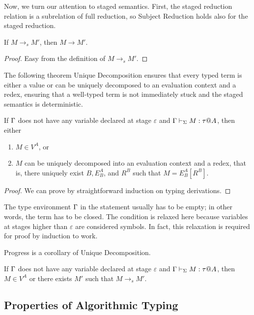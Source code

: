 Now, we turn our attention to staged semantics.  First, the staged
reduction relation is a subrelation of full reduction, so Subject
Reduction holds also for the staged reduction.

\begin{theorem}
  If $M \longrightarrow_s M'$, then $M \longrightarrow M'$.
\end{theorem}
\begin{proof}
    Easy from the definition of \( M \longrightarrow_s M' \).
\end{proof}

The following theorem Unique Decomposition ensures that every typed
term is either a value or can be uniquely decomposed to an evaluation
context and a redex, ensuring that a well-typed term is not
immediately stuck and the staged semantics is deterministic.

\begin{theorem}
  If $\Gamma$ does not have any variable declared at stage $\varepsilon$ 
  and $\Gamma \vdash_\Sigma M : \tau @ A$, then either
  \begin{enumerate}
  \item $ M \in V^A$, or
  \item $M$ can be uniquely decomposed into an evaluation context and a redex, that is, there uniquely exist $B, E^A_B$, and $R^B$ such that $M = E^A_B[R^B]$.
  \end{enumerate}
\end{theorem}

\begin{proof}
  We can prove by straightforward induction on typing derivations.
\end{proof}

The type environment $\Gamma$ in the statement usually has to be empty; in other
words, the term has to be closed. The condition is relaxed here because
variables at stages higher than \(\varepsilon\) are considered symbols. In
fact, this relaxation is required for proof by induction to work.

Progress is a corollary of Unique Decomposition.

\begin{theorem}[Progress]
	If $\Gamma$ does not have any variable declared at stage $\varepsilon$ and $\Gamma \vdash_\Sigma M : \tau  @ A$, then
	$ M \in V^A $ or there exists $M'$ such that $M \longrightarrow_s M'$.
\end{theorem}

\subsection{Properties of Algorithmic Typing}

